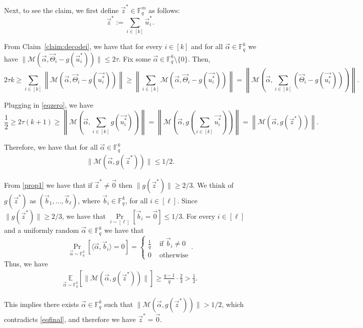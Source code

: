 \documentclass[11pt]{article}
\newcommand{\F}{\mathbb{F}}
\renewcommand{\ge}{ \geqslant}
\renewcommand{\le}{ \leqslant}
\renewcommand{\kappa}{\tau}
\newcommand{\M}{\mathcal{M}}
\begin{document}
Next, to see the claim, we first define $\vec{z}^\ast\in \F_q^m$ as follows:
$$
\vec{z}^\ast:=\sum_{i\in[k]}\vec{u}_i^\ast.
$$


From Claim~\ref{claim:decodei}, we have that for every $i\in[k]$ and for all $\vec{\alpha}\in \F_q^k$ we have $\|\M(\vec{\alpha},\vec{\Theta}_i-g(\vec{u}_i^\ast))\|\le 2\kappa$.  
Fix some $\vec{\alpha}\in \F_q^k\setminus \{0\}$. Then,
$$2\kappa k\ge   \sum_{i\in[k]}\left\|\M(  \vec{\alpha},\vec{\Theta}_i-g(\vec{u_i^\ast})) \right\| \ge \left\|\sum_{i\in[k]}\M(  \vec{\alpha},\vec{\Theta}_i-g(\vec{u_i^\ast})) \right\|=\left\|\M\left(  \vec{\alpha},\sum_{i\in[k]}\left(\vec{\Theta}_i-g(\vec{u_i^\ast})\right)\right) \right\|.$$ 
 
Plugging in \eqref{eqzero}, we have
$$\frac{1}{2}\ge 2\kappa (k+1)\ge \left\|\M\left(  \vec{\alpha},\sum_{i\in[k]}g(\vec{u_i^\ast})\right) \right\|=\left\|\M\left(  \vec{\alpha},g\left(\sum_{i\in[k]}\vec{u_i^\ast}\right)\right) \right\|=\left\|\M\left(  \vec{\alpha},g\left(\vec{z}^\ast\right)\right) \right\|.$$

Therefore, we have that for all $\vec{\alpha}\in\F_q^k$
\begin{align}
\|\M\left(  \vec{\alpha},g\left(\vec{z}^\ast\right)\right)\|\le1/2.\label{eqfinal}
\end{align}

From \eqref{prop1} we have that if $\vec{z}^\ast\neq \vec{0}$ then  $\|g(\vec{z}^\ast)\|\ge 2/3$.
We think of $g(\vec{z}^\ast)$ as $(\vec{b}_1,\ldots, \vec{b}_{\ell})$, where $\vec{b}_i\in\F_q^k$, for all $i\in[\ell]$. Since $\|g(\vec{z}^\ast)\|\ge 2/3$, we have that $\underset{i\sim [\ell]}{\Pr}[\vec{b}_i=\vec{0}]\le 1/3$. For every $i\in[\ell]$ and a uniformly random $\vec{\alpha}\in\F_q^k$ we have that  $$\Pr_{\vec{\alpha}\sim\F_q^k}[\langle \vec{\alpha},\vec{b}_i\rangle=0]=\begin{cases}
\frac{1}{q}&\text{ if }\vec{b}_i\neq 0\\
0&\text{ otherwise}\end{cases} .$$
 Thus, we have
\begin{align*} \underset{\vec{\alpha}\sim\F_q^k}{\mathbb{E}}\left[\|\M(\vec{\alpha},g(\vec{z}^\ast))\|\right]\ge \frac{q-1}{q}\cdot \frac{2}{3}>\frac{1}{2}. 
\end{align*}

This implies there exists $ \vec{\alpha}\in\F_q^k$ such that $\|\M(\vec{\alpha},g\left(\vec{z}^\ast\right))\|>1/2$, which contradicts \eqref{eqfinal}, and therefore we have $\vec{z}^\ast= \vec{0}$.
\end{document}
